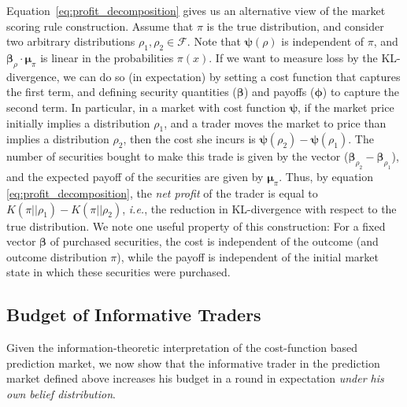 \documentclass{article}
\newcommand{\family}{\mathcal F}
\newcommand{\betavec}{\pmb{\beta}}
\newcommand{\muvec}{\pmb{\mu}}
\newcommand{\lpf}{\mathbf{\psi}} %
\newcommand{\suff}{\pmb{\phi}} %
\begin{document}
Equation~\ref{eq:profit_decomposition} gives us an alternative view of the
market scoring rule construction. Assume that $\pi$ is the true distribution, and consider two arbitrary
distributions $\rho_1, \rho_2 \in \family$. Note that $\lpf(\rho)$  is independent of $\pi$, and $\betavec_\rho \cdot \muvec_\pi$ is linear in the probabilities $\pi(x)$. If we want to measure loss by the KL-divergence, we can do so (in expectation) by setting a cost function that captures the first term, and defining security quantities ($\betavec$) and payoffs ($\suff$) to capture the second term.  In particular, in a market with cost function $\lpf$, if the
market price initially implies a distribution $\rho_1$, and a trader moves
the market to price than implies a distribution $\rho_2$, then the cost she
incurs is $\lpf(\rho_2) - \lpf(\rho_1)$. The number of securities bought to make this trade is given by the vector ($\betavec_{\rho_2} - \betavec_{\rho_1}$), and the expected payoff of the securities are given by $\muvec_\pi$. Thus, by equation \ref{eq:profit_decomposition}, the {\em net profit} of the trader is equal to $K(\pi||\rho_1) - K(\pi||\rho_2)$, {\it i.e.}, the reduction in KL-divergence with respect to the true distribution.  We note one useful property of this construction: For a fixed vector $\betavec$ of purchased securities, the cost is independent of the outcome 
(and outcome distribution $\pi$), while the payoff is independent of the initial market state in which these securities were purchased.


\subsection{Budget of Informative Traders}\label{sec:inf}
Given the  information-theoretic interpretation of the cost-function based prediction market, we now show that the informative trader in the prediction market defined above increases his budget in a round in expectation {\em under his own belief distribution}.
\end{document}
